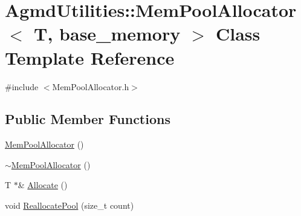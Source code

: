 \hypertarget{class_agmd_utilities_1_1_mem_pool_allocator}{\section{Agmd\+Utilities\+:\+:Mem\+Pool\+Allocator$<$ T, base\+\_\+memory $>$ Class Template Reference}
\label{class_agmd_utilities_1_1_mem_pool_allocator}
}


{\ttfamily \#include $<$Mem\+Pool\+Allocator.\+h$>$}

\subsection*{Public Member Functions}
\begin{DoxyCompactItemize}
\item 
\hyperlink{class_agmd_utilities_1_1_mem_pool_allocator_a46eae618b846bd04044a83c5d0720868}{Mem\+Pool\+Allocator} ()
\item 
\hyperlink{class_agmd_utilities_1_1_mem_pool_allocator_adaf46fe1d375e2b6fab9ce89a0069076}{$\sim$\+Mem\+Pool\+Allocator} ()
\item 
T $\ast$\& \hyperlink{class_agmd_utilities_1_1_mem_pool_allocator_a1f60b93f1ded808afa12365ffb1926f1}{Allocate} ()
\item 
void \hyperlink{class_agmd_utilities_1_1_mem_pool_allocator_ad9504fbb01b0d6f262736b281162f03a}{Reallocate\+Pool} (size\+\_\+t count)
\end{DoxyCompactItemize}


